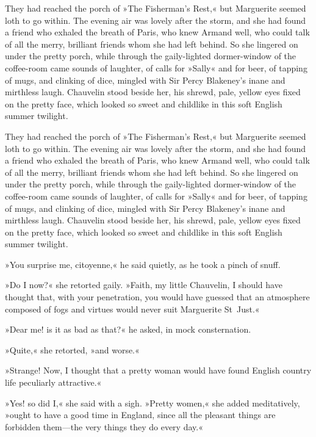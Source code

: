 \makeatletter
{}
{%
They had reached the porch of »The Fisherman's Rest,« but Marguerite seemed loth to go within. The evening air was lovely after the storm, and she had found a friend who exhaled the breath of Paris, who knew Armand well, who could talk of all the merry, brilliant friends whom she had left behind. So she lingered on under the pretty porch, while through the gaily-lighted dormer-window of the coffee-room came sounds of laughter, of calls for »Sally« and for beer, of tapping of mugs, and clinking of dice, mingled with Sir Percy Blakeney's inane and mirthless laugh. Chauve\-lin stood beside her, his shrewd, pale, yellow eyes fixed on the pretty face, which looked so sweet and childlike in this soft English summer twilight.

}{%
They had reached the porch of »The Fisherman's Rest,« but Marguerite seemed loth to go within. The evening air was lovely after the storm, and she had found a friend who exhaled the breath of Paris, who knew Armand well, who could talk of all the merry, brilliant friends whom she had left behind. So she lingered on under the pretty porch, while through the gaily-lighted dormer-window of the coffee-room came sounds of laughter, of calls for »Sally« and for beer, of tapping of mugs, and clinking of dice, mingled with Sir Percy Blakeney's inane and mirthless laugh. \newline Chauve\-lin stood beside her, his shrewd, pale, yellow eyes fixed on the pretty face, which looked so sweet and childlike in this soft English summer twilight.
}
\makeatother



»You surprise me, citoyenne,« he said quietly, as he took a pinch of snuff.

»Do I now?« she retorted gaily. »Faith, my little Chauvelin, I should have thought that, with your penetration, you would have guessed that an atmosphere composed of fogs and virtues would never suit Marguerite St~Just.«

»Dear me! is it as bad as that?« he asked, in mock consternation.

»Quite,« she retorted, »and worse.«

»Strange! Now, I thought that a pretty woman would have found English country life peculiarly attractive.«

»Yes! so did I,« she said with a sigh. »Pretty women,« she added meditatively, »ought to have a good time in England, since all the pleasant things are forbidden them—the very things they do every day.«

